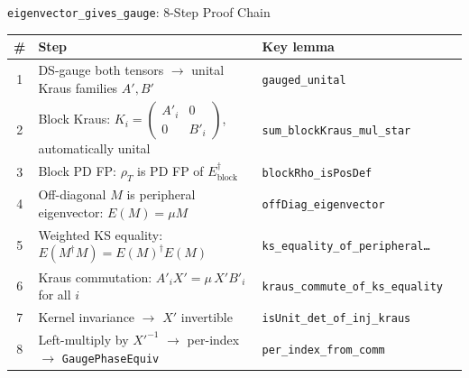 \documentclass[aspectratio=169,10pt]{beamer}
\begin{document}
\begin{frame}{\texttt{eigenvector\_gives\_gauge}: 8-Step Proof Chain}
    \vspace{-0.5em}

    {\small
    \begin{tabular}{@{}c p{6.2cm} l c@{}}
        \toprule
        \textbf{\#} & \textbf{Step} & \textbf{Key lemma} & \\
        \midrule
        \rowcolor{cardbg}
        1 & DS-gauge both tensors $\to$ unital Kraus families $A', B'$
          & \texttt{gauged\_unital} & \proved{} \\
        2 & Block Kraus: $K_i = (\begin{smallmatrix}A'_i & 0 \\ 0 & B'_i\end{smallmatrix})$, automatically unital
          & \texttt{sum\_blockKraus\_mul\_star} & \proved{} \\
        \rowcolor{cardbg}
        3 & Block PD FP: $\rho_T$ is PD FP of $E_{\mathrm{block}}^\dagger$
          & \texttt{blockRho\_isPosDef} & \proved{} \\
        4 & Off-diagonal $M$ is peripheral eigenvector: $E(M) = \mu M$
          & \texttt{offDiag\_eigenvector} & \proved{} \\
        \rowcolor{cardbg}
        5 & Weighted KS equality: $E(M^\dagger M) = E(M)^\dagger E(M)$
          & \texttt{ks\_equality\_of\_peripheral\ldots} & \proved{} \\
        6 & Kraus commutation: $A'_i X' = \mu\, X' B'_i$ for all $i$
          & \texttt{kraus\_commute\_of\_ks\_equality} & \proved{} \\
        \rowcolor{cardbg}
        7 & Kernel invariance $\to$ $X'$ invertible
          & \texttt{isUnit\_det\_of\_inj\_kraus} & \proved{} \\
        8 & Left-multiply by $X'^{-1}$ $\to$ per-index $\to$ \texttt{GaugePhaseEquiv}
          & \texttt{per\_index\_from\_comm} & \proved{} \\
        \bottomrule
    \end{tabular}
    }

    \vspace{0.3em}
    \begin{center}
    \end{center}
\end{frame}
\end{document}

